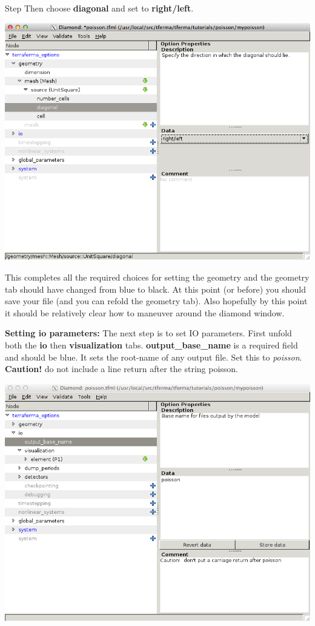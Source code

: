 \begin{steps}{Step}
Then choose \textbf{diagonal} and set to \textbf{right/left}. 
\begin{center}
    \includegraphics[width=\diamondwidth]{figures/screendumps/diamond_poisson_03d.png}
\end{center}
This completes all the required choices for setting the geometry and
the geometry tab should have changed from blue to black. At this point
(or before) you should save your file (and you can refold the geometry
tab). Also hopefully by this point it
  should be relatively clear how to maneuver around the diamond
  window.  
\item \textbf{Setting io parameters:}  The next step is to set IO
  parameters.
First unfold both the \textbf{io} then \textbf{visualization} tabs.
\textbf{output\_base\_name} is a required field and should be blue. It sets the
root-name of any output file.  Set this to \emph{poisson}.
\textbf{Caution!} do not include a line return after the string poisson. 
\begin{center}
    \includegraphics[width=\diamondwidth]{figures/screendumps/diamond_poisson_04.png}

\end{center}
\end{steps}
